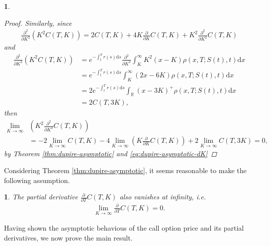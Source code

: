 \documentclass[english]{article}
\numberwithin{equation}{section}
\numberwithin{figure}{section}
\theoremstyle{bolddescit}
\theoremstyle{definition}
\theoremstyle{definition}
\theoremstyle{plain}
\newtheorem{lemma}[theorem]{\protect\lemmaname}
\theoremstyle{plain}
\theoremstyle{bolddesc}
\newtheorem{assumption}[theorem]{\protect\assumptionname}
\theoremstyle{plain}
\theoremstyle{remark}
\providecommand{\assumptionname}{Assumption}
\providecommand{\lemmaname}{Lemma}
\begin{document}
\begin{lemma}
\begin{proof}
    Similarly, since
    \begin{align*}
      \frac{\partial^2}{\partial K^2} (K^2 C(T,K))
      = 2C(T,K) + 4K \frac{\partial}{\partial K} C(T,K) + K^2 \frac{\partial^2}{\partial K^2} C(T,K)
    \end{align*}
    and
    \begin{align*}
      \frac{\partial^2}{\partial K^2} (K^2 C(T,K))
      &= e^{-\int_t^T r(s)\mathrm{d}s} \frac{\partial^2}{\partial K^2} \int_K^\infty K^2 (x-K) \rho(x,T;S(t),t) \mathrm{d}x\\
      &= e^{-\int_t^T r(s)\mathrm{d}s} \int_K^\infty (2x-6K) \rho(x,T;S(t),t) \mathrm{d}x\\
      &= 2 e^{-\int_t^T r(s)\mathrm{d}s} \int_\mathbb{R} (x-3K)^+ \rho(x,T;S(t),t) \mathrm{d}x\\
      &= 2 C(T,3K),
    \end{align*}
    then
    \begin{align*}
      \lim_{K \to \infty} &\left(K^2 \frac{\partial^2}{\partial K^2} C(T,K)\right)\\
      &= - 2\lim_{K \to \infty} C(T,K)
        - 4 \lim_{K \to \infty} \left(K \frac{\partial}{\partial K} C(T,K)\right)
        + 2 \lim_{K \to \infty} C(T,3K)
      = 0,
    \end{align*}
    by Theorem \ref{thm:dupire-asymptotic} and \eqref{eq:dupire-asymptotic-dK}
  \end{proof}
\end{lemma}

Considering Theorem \ref{thm:dupire-asymptotic}, it seems reasonable to make the following assumption.

\begin{assumption}\label{ass:dupire-asymptotic-dT}
  The partial derivative $\frac{\partial}{\partial T} C(T,K)$ also vanishes at infinity, i.e.
  \begin{align*}
    \lim_{K \to \infty} \frac{\partial}{\partial T} C(T,K) = 0.
  \end{align*}
\end{assumption}

Having shown the asymptotic behavious of the call option price and its partial derivatives, we now prove the main result.
\end{document}
